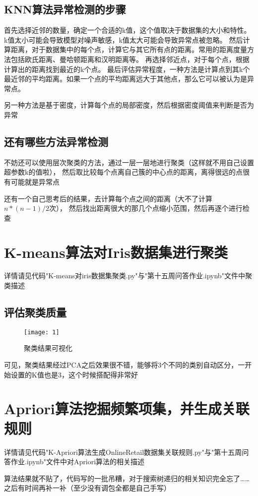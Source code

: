 \documentclass[10pt]{article}
\begin{document}
	\subsection{KNN算法异常检测的步骤}
	首先选择近邻的数量，确定一个合适的k值，这个值取决于数据集的大小和特性。k值太小可能会导致模型对噪声敏感，k值太大可能会导致异常点被忽略。
	然后计算距离，对于数据集中的每个点，计算它与其它所有点的距离。常用的距离度量方法包括欧氏距离、曼哈顿距离和汉明距离等。
	再选择邻近点，对于每个点，根据计算出的距离找到最近的k个点。
	最后评估异常程度，一种方法是计算点到其k个最近邻的平均距离。如果一个点的平均距离远大于其他点，那么它可以被认为是异常点。\par
	另一种方法是基于密度，计算每个点的局部密度，然后根据密度阈值来判断是否为异常\par
	
	\subsection{还有哪些方法异常检测}
	不妨还可以使用层次聚类的方法，通过一层一层地进行聚类（这样就不用自己设置超参数k的值啦），
	然后取比较每个点离自己簇的中心点的距离，离得很远的点很有可能就是异常点\par
	还有一个自己思考后的结果，去计算每个点之间的距离（大不了计算$n*(n-1)/2$次），
	然后找出距离很大的那几个点缩小范围，然后再逐个进行检查
	
	\section{K-means算法对Iris数据集进行聚类}
	详情请见代码"K-means对iris数据集聚类.py"与"第十五周问答作业.ipynb"文件中聚类描述\par
	\subsection{评估聚类质量}
	\begin{figure}[H]
		\centering
		\texttt{[image: 1]}
		\caption{聚类结果可视化}
	\end{figure}
	可见，聚类结果经过PCA之后效果很不错，能够将3个不同的类别自动区分，一开始设置的K值也是3，这个时候搭配得非常好\par
	
	\section{Apriori算法挖掘频繁项集，并生成关联规则}
	详情请见代码"K-Apriori算法生成OnlineRetail数据集关联规则.py"与"第十五周问答作业.ipynb"文件中对Apriori算法的相关描述\par
	算法结果就不贴了，代码写的一批吊糟，对于搜索树递归的相关知识完全忘了……之后有时间再补一补（至少没有调包全都是自己手写）
\end{document}
